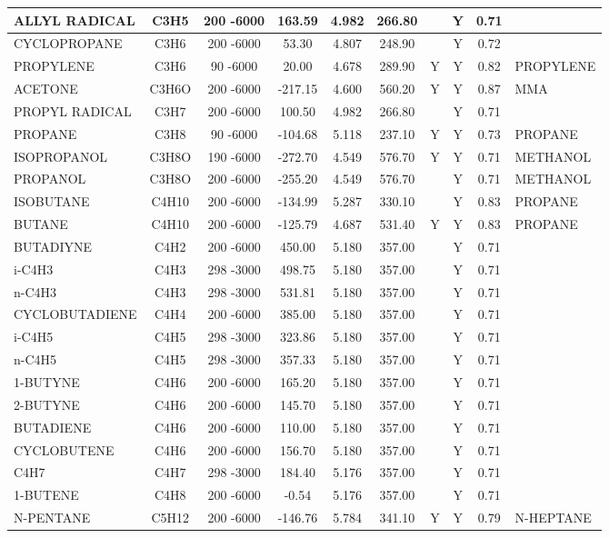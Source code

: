 \begin{longtable}{@{\extracolsep{\fill}}|l|c|c|c|c|c|c|c|c|l|}
ALLYL RADICAL&C3H5&200 -6000&  163.59& 4.982&   266.80& &Y& 0.71&\\ \hline
CYCLOPROPANE&C3H6&200 -6000&   53.30& 4.807&   248.90& &Y& 0.72&\\ \hline
PROPYLENE&C3H6&90 -6000&   20.00& 4.678&   289.90&Y&Y& 0.82&PROPYLENE\\ \hline
ACETONE&C3H6O&200 -6000& -217.15& 4.600&   560.20&Y&Y& 0.87&MMA\\ \hline
PROPYL RADICAL&C3H7&200 -6000&  100.50& 4.982&   266.80& &Y& 0.71&\\ \hline
PROPANE&C3H8&90 -6000& -104.68& 5.118&   237.10&Y&Y& 0.73&PROPANE\\ \hline
ISOPROPANOL&C3H8O&190 -6000& -272.70& 4.549&   576.70&Y&Y& 0.71&METHANOL\\ \hline
PROPANOL&C3H8O&200 -6000& -255.20& 4.549&   576.70& &Y& 0.71&METHANOL\\ \hline
ISOBUTANE&C4H10&200 -6000& -134.99& 5.287&   330.10& &Y& 0.83&PROPANE\\ \hline
BUTANE&C4H10&200 -6000& -125.79& 4.687&   531.40&Y&Y& 0.83&PROPANE\\ \hline
BUTADIYNE&C4H2&200 -6000&  450.00& 5.180&   357.00& &Y& 0.71&\\ \hline
i-C4H3&C4H3&298 -3000&  498.75& 5.180&   357.00& &Y& 0.71&\\ \hline
n-C4H3&C4H3&298 -3000&  531.81& 5.180&   357.00& &Y& 0.71&\\ \hline
CYCLOBUTADIENE&C4H4&200 -6000&  385.00& 5.180&   357.00& &Y& 0.71&\\ \hline
i-C4H5&C4H5&298 -3000&  323.86& 5.180&   357.00& &Y& 0.71&\\ \hline
n-C4H5&C4H5&298 -3000&  357.33& 5.180&   357.00& &Y& 0.71&\\ \hline
1-BUTYNE&C4H6&200 -6000&  165.20& 5.180&   357.00& &Y& 0.71&\\ \hline
2-BUTYNE&C4H6&200 -6000&  145.70& 5.180&   357.00& &Y& 0.71&\\ \hline
BUTADIENE&C4H6&200 -6000&  110.00& 5.180&   357.00& &Y& 0.71&\\ \hline
CYCLOBUTENE&C4H6&200 -6000&  156.70& 5.180&   357.00& &Y& 0.71&\\ \hline
C4H7&C4H7&298 -3000&  184.40& 5.176&   357.00& &Y& 0.71&\\ \hline
1-BUTENE&C4H8&200 -6000&   -0.54& 5.176&   357.00& &Y& 0.71&\\ \hline
N-PENTANE&C5H12&200 -6000& -146.76& 5.784&   341.10&Y&Y& 0.79&N-HEPTANE\\ \hline

\end{longtable}
